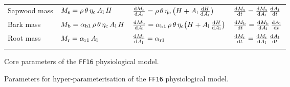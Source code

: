 \documentclass[10pt,twoside]{article}
\begin{document}
\begin{table}[h!]
\begin{tabular}{p{2.5cm}p{3.5cm}p{5cm}p{4cm} }
Sapwood mass &
$M_{\rm s} = \rho \, \theta \, \eta_{\rm c} \, A_{\rm l} \, H $ &
$\frac{{\rm d}M_{\rm s}}{{\rm d}A_{\rm l}} = \rho \, \theta \, \eta_{\rm c} \, \big(H + A_{\rm l} \, \frac{{\rm d}H}{{\rm d}A_{\rm l}} \big)$ &
$\frac{{\rm d}M_{\rm s}}{{\rm d}t} = \frac{{\rm d}M_{\rm s}}{{\rm d}A_{\rm l}} \, \frac{{\rm d}A_{\rm l}}{{\rm d}t}$ \\
Bark mass &
$M_{\rm b} = \alpha_{{\rm b1}} \, \rho \, \theta \, \eta_{\rm c} \, A_{\rm l} \, H $ &
$\frac{{\rm d}M_{\rm b}}{{\rm d}A_{\rm l}} = \alpha_{{\rm b1}} \, \rho \, \theta \, \eta_{\rm c}\big(H + A_{\rm l} \, \frac{{\rm d}H}{{\rm d}A_{\rm l}} \big)$ &
$\frac{{\rm d}M_{\rm b}}{{\rm d}t} = \frac{{\rm d}M_{\rm b}}{{\rm d}A_{\rm l}} \, \frac{{\rm d}A_{\rm l}}{{\rm d}t}$ \\
Root mass &
$M_{\rm r} = \alpha_{{\rm r1}} \, A_{\rm l}$ &
$\frac{{\rm d}M_{\rm r}}{{\rm d}A_{\rm l}} = \alpha_{{\rm r1}}$ &
$\frac{{\rm d}M_{\rm r}}{{\rm d}t} = \frac{{\rm d}M_{\rm r}}{{\rm d}A_{\rm l}} \, \frac{{\rm d}A_{\rm l}}{{\rm d}t}$ \\
\hline \\
\end{tabular}
\label{tab:allometry}
\end{table}

\newpage

\begin{table}[h!]
\caption{Core parameters of the \texttt{FF16} physiological model.}

\label{tab:params_core}
\end{table}

\begin{table}[h!]
\caption{Parameters for hyper-parameterisation of the \texttt{FF16} physiological model.}

\label{tab:params_hyper}
\end{table}

\clearpage


\end{document}

